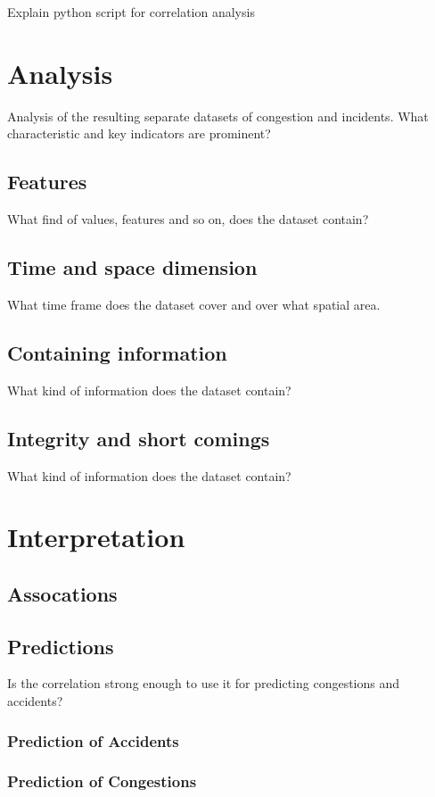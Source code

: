 \documentclass[a4paper,12pt]{report}
\begin{document}
Explain python script for correlation analysis

\cite{Potvin2020}


\chapter{Analysis}

Analysis of the resulting separate datasets of congestion and incidents. What characteristic and key indicators are prominent?
\section{Features}
What find of values, features and so on, does the dataset contain?
\section{Time and space dimension}
What time frame does the dataset cover and over what spatial area.
\section{Containing information}
What kind of information does the dataset contain?
\section{Integrity and short comings}
What kind of information does the dataset contain?

\chapter{Interpretation}

\section{Assocations}

\section{Predictions}
Is the correlation strong enough to use it for predicting congestions and accidents?

\subsection{Prediction of Accidents}

\subsection{Prediction of Congestions}
\end{document}
